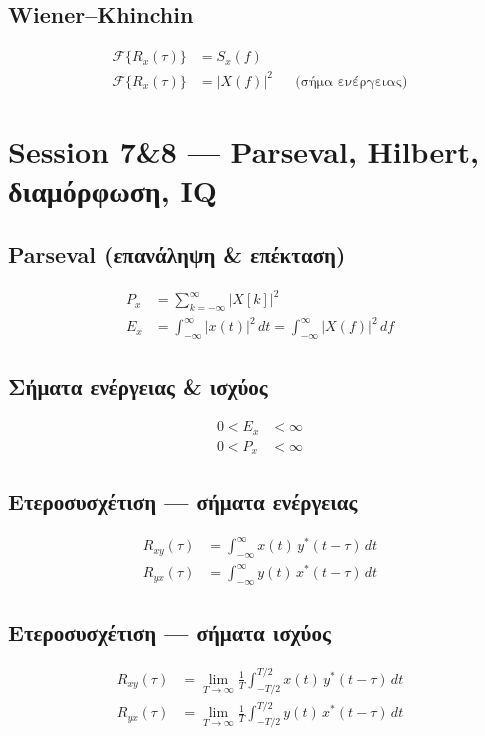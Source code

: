 \documentclass[11pt,a4paper]{article}
\newcommand{\F}{\mathcal{F}}
\begin{document}
\subsection{Wiener--Khinchin}
\begin{align}
\F\{R_x(\tau)\} &= S_x(f) \\
\F\{R_x(\tau)\} &= |X(f)|^2 && \text{(σήμα ενέργειας)}
\end{align}

\section{Session 7\&8 — Parseval, Hilbert, διαμόρφωση, IQ}

\subsection{Parseval (επανάληψη \& επέκταση)}
\begin{align}
P_x &= \sum_{k=-\infty}^{\infty} |X[k]|^2 \\
E_x &= \int_{-\infty}^{\infty} |x(t)|^2\,dt = \int_{-\infty}^{\infty} |X(f)|^2\,df
\end{align}

\subsection{Σήματα ενέργειας \& ισχύος}
\begin{align}
0 < E_x &< \infty \\
0 < P_x &< \infty
\end{align}

\subsection{Ετεροσυσχέτιση — σήματα ενέργειας}
\begin{align}
R_{xy}(\tau) &= \int_{-\infty}^{\infty} x(t)\,y^*(t-\tau)\,dt \\
R_{yx}(\tau) &= \int_{-\infty}^{\infty} y(t)\,x^*(t-\tau)\,dt
\end{align}

\subsection{Ετεροσυσχέτιση — σήματα ισχύος}
\begin{align}
R_{xy}(\tau) &= \lim_{T\to\infty} \frac{1}{T}\int_{-T/2}^{T/2} x(t)\,y^*(t-\tau)\,dt \\
R_{yx}(\tau) &= \lim_{T\to\infty} \frac{1}{T}\int_{-T/2}^{T/2} y(t)\,x^*(t-\tau)\,dt
\end{align}
\end{document}
